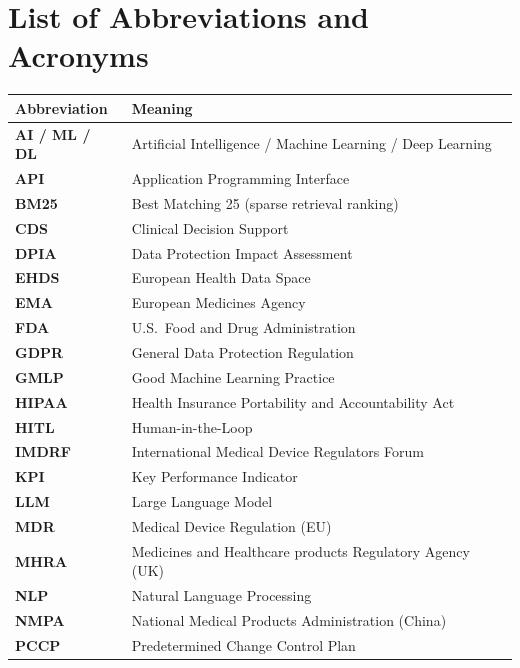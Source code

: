 \documentclass[12pt,a4paper,oneside]{report}
\begin{document}
\clearpage

\tableofcontents
\clearpage

\listoffigures
\vspace{1.2em}
\listoftables
\clearpage

\chapter*{List of Abbreviations and Acronyms}
\noindent
\begin{tabular}{@{}>{\bfseries}p{}p{}@{}}
Abbreviation & Meaning \\
\midrule
AI / ML / DL & Artificial Intelligence / Machine Learning / Deep Learning \\
API & Application Programming Interface \\
BM25 & Best Matching 25 (sparse retrieval ranking) \\
CDS & Clinical Decision Support \\
DPIA & Data Protection Impact Assessment \\
EHDS & European Health Data Space \\
EMA & European Medicines Agency \\
FDA & U.S.\ Food and Drug Administration \\
GDPR & General Data Protection Regulation \\
GMLP & Good Machine Learning Practice \\
HIPAA & Health Insurance Portability and Accountability Act \\
HITL & Human-in-the-Loop \\
IMDRF & International Medical Device Regulators Forum \\
KPI & Key Performance Indicator \\
LLM & Large Language Model \\
MDR & Medical Device Regulation (EU) \\
MHRA & Medicines and Healthcare products Regulatory Agency (UK) \\
NLP & Natural Language Processing \\
NMPA & National Medical Products Administration (China) \\
PCCP & Predetermined Change Control Plan \\

\end{tabular}
\end{document}
